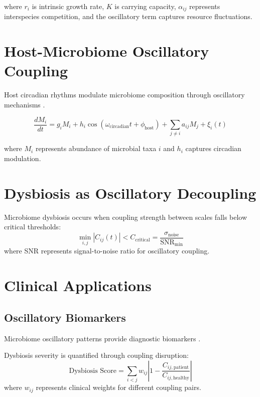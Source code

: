 \documentclass[twocolumn]{article}
\begin{document}
where $r_i$ is intrinsic growth rate, $K$ is carrying capacity, $\alpha_{ij}$ represents interspecies competition, and the oscillatory term captures resource fluctuations.

\section{Host-Microbiome Oscillatory Coupling}

Host circadian rhythms modulate microbiome composition through oscillatory mechanisms \citep{thaiss2014transkingdom,liang2015rhythmicity}.

\begin{equation}
\frac{dM_i}{dt} = g_i M_i + h_i \cos(\omega_{\text{circadian}}t + \phi_{\text{host}}) + \sum_{j \neq i} a_{ij} M_j + \xi_i(t)
\label{eq:circadian_microbiome}
\end{equation}

where $M_i$ represents abundance of microbial taxa $i$ and $h_i$ captures circadian modulation.

\section{Dysbiosis as Oscillatory Decoupling}

\begin{theorem}
Microbiome dysbiosis occurs when coupling strength between scales falls below critical thresholds:
\begin{equation}
\min_{i,j} |C_{ij}(t)| < C_{\text{critical}} = \frac{\sigma_{\text{noise}}}{\text{SNR}_{\text{min}}}
\label{eq:dysbiosis_threshold}
\end{equation}
where SNR represents signal-to-noise ratio for oscillatory coupling.
\end{theorem}

\section{Clinical Applications}

\subsection{Oscillatory Biomarkers}

Microbiome oscillatory patterns provide diagnostic biomarkers \citep{pasolli2016accessible,thomas2019metagenomic}.

\begin{definition}
Dysbiosis severity is quantified through coupling disruption:
\begin{equation}
\text{Dysbiosis Score} = \sum_{i<j} w_{ij} \left|1 - \frac{C_{ij,\text{patient}}}{C_{ij,\text{healthy}}}\right|
\label{eq:dysbiosis_score}
\end{equation}
where $w_{ij}$ represents clinical weights for different coupling pairs.
\end{definition}
\end{document}
